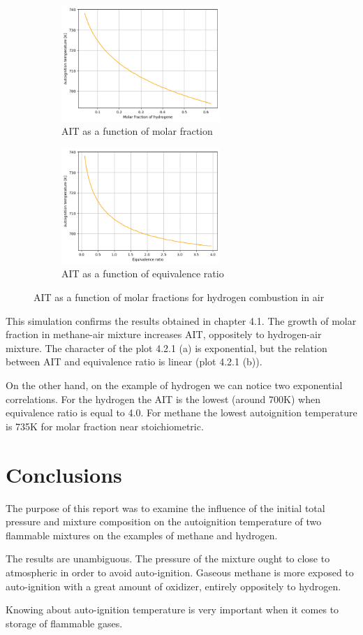\documentclass[a4paper,11pt]{article}
\begin{document}
\begin{figure}[h]
\begin{subfigure}{.5\textwidth}
\centering
\includegraphics[width=6cm]{2wodor.png}
\caption{AIT as a function of molar fraction}
\end{subfigure}
\begin{subfigure}{.5\textwidth}
\centering
\includegraphics[width=6cm]{3wodor.png}
\caption{AIT as a function of equivalence ratio}
\end{subfigure}
\caption{AIT as a function of molar fractions for hydrogen combustion in air}
\end{figure}
	This simulation confirms the results obtained in chapter 4.1. The growth of molar fraction in methane-air mixture  increases AIT, oppositely to hydrogen-air mixture. The character of the plot 4.2.1 (a) is exponential, but the relation between AIT and equivalence ratio is linear (plot 4.2.1 (b)). \par
	On the other hand, on the example of hydrogen we can notice two exponential correlations. For the hydrogen the AIT is the lowest (around 700K) when equivalence ratio is equal to 4.0. For methane the lowest autoignition temperature is 735K for molar fraction near stoichiometric. 

\section{Conclusions}
   The purpose of this report was to examine the influence of the initial total pressure and mixture composition on the autoignition temperature of two flammable mixtures on the examples of methane and hydrogen.\par
    The results are unambiguous. The pressure of the mixture ought to close to atmospheric in order to avoid auto-ignition. Gaseous methane is more exposed to auto-ignition with a great amount of oxidizer, entirely oppositely to hydrogen.\par
    Knowing about auto-ignition temperature is very important when it comes to storage of flammable gases.
\end{document}
